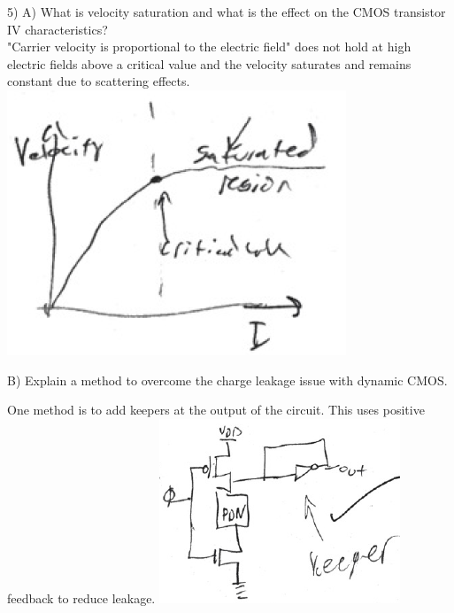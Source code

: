 \documentclass[9pt,fleqn]{article}
\begin{document}
\begin{multicols}{3}
    5)
        A) What is velocity saturation and what is the effect on the CMOS transistor
           IV characteristics? \\

           "Carrier velocity is proportional to the electric field" does not hold
           at high electric fields above a critical value and the velocity saturates
           and remains constant due to scattering effects.
            \includegraphics[width=\linewidth]{ques5a.png}

        B) Explain a method to overcome the charge leakage issue with dynamic CMOS.

           One method is to add keepers at the output of the circuit. This uses positive
           feedback to reduce leakage.
            \includegraphics[width=\linewidth]{ques5b.png}


\end{multicols}
\end{document}
